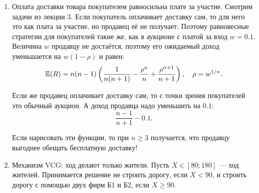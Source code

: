 \begin{enumerate}
\begin{figure}
\hfill
{}
\hfill
{}
\hfill
\end{figure}

\item Оплата доставки товара покупателем равносильна плате за участие. Смотрим задачи из лекции 3. Если покупатель оплачивает доставку сам, то для него это как плата за участие, но продавец её не получает. Поэтому равновесные стратегии для покупателей такие же, как в аукционе с платой за вход $ w=0.1 $. Величина $ w $ продавцу не достаётся, поэтому его ожидаемый доход уменьшается на $ w(1-\rho) $ и равен:
\begin{equation}
\operatorname{\mathbb{E}}(R)=n(n-1)\left(\frac{1}{n(n+1)}-\frac{\rho^{n}}{n}+\frac{\rho^{n+1}}{n+1}\right),\quad \rho=w^{1/n}.
\end{equation}


Если же продавец оплачивает доставку сам, то с точки зрения покупателей  это обычный аукцион. А доход продавца надо уменьшить на $ 0.1 $:
\begin{equation}
\frac{n-1}{n+1}-0.1.
\end{equation}

Если нарисовать эти функции, то при $ n\geq 3 $ получается, что продавцу выгоднее обещать бесплатную доставку!

\item Механизм VCG: ход делают только жители. Пусть $ X\in[80;180]$ — ход жителей. Принимается решение не строить дорогу, если $ X<90 $, и строить дорогу с помощью двух фирм Б1 и Б2, если $ X\geq 90 $.


\end{enumerate}

